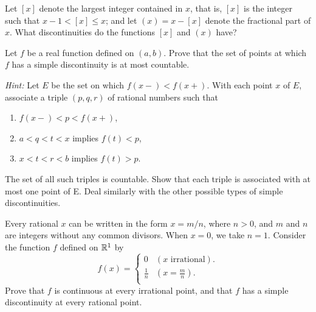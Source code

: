 \begin{myExercise}
    \label{ex:4.16}
    Let $[x]$ denote the largest integer contained in $x$, 
    that is, $[x]$ is the integer such that $x - 1 < [x] \leq x$; 
    and let $(x) = x - [x]$ denote the fractional part of $x$. 
    What discontinuities do the functions $[x]$ and $(x)$ have?
\end{myExercise}


\begin{myExercise}
    \label{ex:4.17}
    Let $f$ be a real function defined on $(a, b)$. 
    Prove that the set of points at which $f$ has a simple discontinuity is at most countable. 
    
    \emph{Hint:} Let $E$ be the set on which $f(x-) <f(x+ )$. 
    With each point $x$ of $E$, associate a triple $(p, q, r)$ of rational numbers such that 
    \begin{enumerate}
        \item $f(x-) < p <f(x+ )$,
        \item $a < q < t < x$ implies $f(t) < p$,
        \item $x < t < r < b$ implies $f(t) > p$.
    \end{enumerate} 
    The set of all such triples is countable. 
    Show that each triple is associated with at most one point of E. Deal similarly with the other possible types of simple discontinuities.
\end{myExercise}


\begin{myExercise}
    \label{ex:4.18}
    Every rational $x$ can be written in the form $x = m/n$, 
    where $n > 0$, and $m$ and $n$ are integers without any common divisors. 
    When $x = 0$, we take $n = 1$. 
    Consider the function $f$ defined on ${\protect\mathbb R}^1$ by 
    \begin{equation*}
        f(x) = \left\{ 
            \begin{array}{ll}
                0 & (x \text{ irrational}). \\
                \frac{1}{n} & \left( x = \frac{m}{n} \right) .\\
            \end{array}
        \right.
    \end{equation*} 
    Prove that $f$ is continuous at every irrational point, 
    and that $f$ has a simple discontinuity at every rational point.
\end{myExercise}


